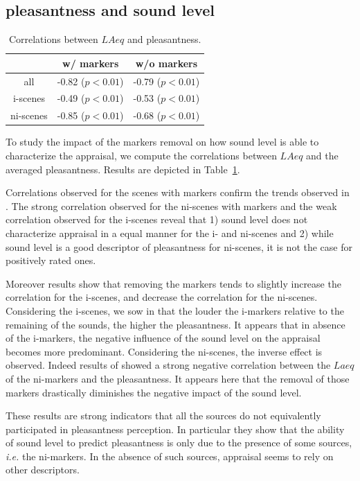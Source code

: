 \documentclass[twoside,twocolumn]{article}
\begin{document}
\subsection{pleasantness and sound level}

\begin{table}[t]
 \centering
\begin{tabular}{c c c} 
            & w/ markers          & w/o markers       \\
\hline
all         & -0.82 ($p<0.01$)    & -0.79 ($p<0.01$)  \\
i-scenes    & -0.49 ($p<0.01$)    & -0.53 ($p<0.01$)  \\
ni-scenes   & -0.85 ($p<0.01$)    & -0.68 ($p<0.01$)  \\
\hline
\end{tabular}
\vspace{0.5mm}
\caption{\label{tab:plCorr} Correlations between $LAeq$ and pleasantness.}
\end{table}

To study the impact of the markers removal on how sound level is able to characterize the appraisal, we compute the correlations between $LAeq$ and the averaged pleasantness. Results are depicted in Table~\ref{tab:plCorr}.

Correlations observed for the scenes with markers confirm the trends observed in \cite{lafayPartI}. The strong correlation observed for the ni-scenes with markers and the weak correlation observed for the i-scenes reveal that 1) sound level does not characterize appraisal in a equal manner for the i- and ni-scenes and 2)  while sound level is a good descriptor of pleasantness for ni-scenes, it is not the case for positively rated ones.

Moreover results show that removing the markers tends to slightly increase the correlation for the i-scenes, and decrease the correlation for the ni-scenes. Considering the i-scenes, we sow in \cite{lafayPartI} that the louder the i-markers relative to the remaining of the sounds, the higher the pleasantness. It appears that in absence of the i-markers, the negative influence of the sound level on the appraisal becomes more predominant. Considering the ni-scenes, the inverse effect is observed. Indeed results of \cite{lafayPartI} showed a strong negative correlation between the $Laeq$ of the ni-markers and the pleasantness. It appears here that the removal of those markers drastically diminishes the negative impact of the sound level.

These results are strong indicators that all the sources do not equivalently participated in pleasantness perception. In particular they show that the ability of sound level to predict pleasantness is only due to the presence of some sources, \emph{i.e.} the ni-markers. In the absence of such sources, appraisal seems to rely on other descriptors.
\end{document}
